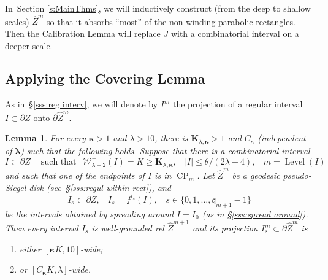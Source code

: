 \documentclass{amsart}
\renewcommand{\sp}{{\ \ }}
\newcommand{\1}{{\mathbb 1 }}
\newcommand{\blambda}{{\boldsymbol\lambda}}
\newcommand{\bkappa}{{\boldsymbol\kappa}}
\newcommand{\Width}{{\mathcal W}}
\newcommand{\wZ}{{\widehat Z}}
\newcommand{\bK}{{\mathbf K}}
\newcommand{\Level}{\operatorname{Level}}
\newcommand{\qq}{\mathfrak{q}}
\newtheorem{lem}[thm]{Lemma}
\theoremstyle{remark}
\numberwithin{equation}{section}
\theoremstyle{definition}
\newcommand{\CP}{{\operatorname{CP}}}
\begin{document}
In~Section \ref{s:MainThms}, we will inductively construct  (from the deep to shallow scales) $\wZ^m$ so that it absorbs ``most'' of the non-winding parabolic rectangles. Then the Calibration Lemma will replace $J$ with a combinatorial interval on a deeper scale.




\subsection{Applying the Covering Lemma}\label{ss:ApplyingCoveringLemma}
As in~\S\ref{sss:reg interv}, we will denote by $I^m$ the projection of a regular interval $I\subset \partial Z$ onto $\partial \wZ^m$.
\begin{lem}
\label{lem:SpredAroundWidth}
For every $\bkappa>1$ and $\lambda>10$, there is $\bK_{\lambda,\bkappa}>1$ and $C_\kappa$ (independent of $\blambda$) such that the following holds. Suppose that there is a combinatorial interval \[I\subset\partial Z\sp\sp \text{ such that }
\sp\Width^+_{\lambda+2}(I)=K \ge \bK_{\lambda,\bkappa},\sp\sp |I|\le \theta / (2\lambda+4),\sp\sp m =\Level(I)\]
and such that one of the endpoints of $I$ is in $\CP_m$. Let $\wZ^m$ be a geodesic pseudo-Siegel disk (see~\S\ref{sss:regul within rect}), and \[ I_s\subset \partial Z,\sp\sp I_s=f^{i_s}(I),\sp\sp s\in \{0,1,\dots, \qq_{m+1}-1\}\] be the intervals obtained by spreading around $I=I_0$ (as in \S\ref{sss:spread around}). Then every interval $I_s$ is well-grounded rel $\wZ^{m+1}$ and its projection $I^m_s\subset \partial \wZ^m$ is  
\begin{enumerate}
\item either $[\bkappa K,10]$-wide; 
\item or $[ C_{\bkappa} K,\lambda]$-wide.
\end{enumerate} 
\end{lem}
\end{document}
